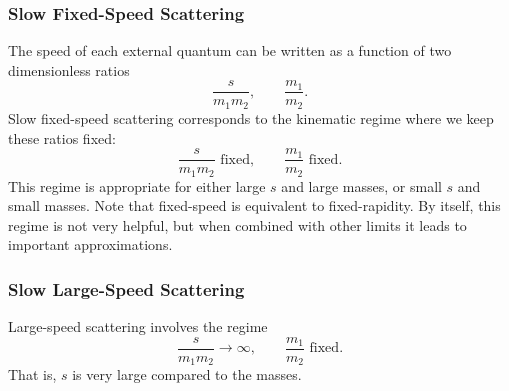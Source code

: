 \subsubsection{Slow Fixed-Speed Scattering}
The speed of each external quantum can be written as a function of two dimensionless ratios
\begin{equation}
	\frac{s}{m_{1} m_{2}}, \qquad \frac{m_{1}}{m_{2}}.
\end{equation}
Slow fixed-speed scattering corresponds to the kinematic regime where we keep these ratios fixed:
\begin{equation}
	\frac{s}{m_{1} m_{2}} \text{ fixed}, \qquad \frac{m_{1}}{m_{2}} \text{ fixed}.
\end{equation}
This regime is appropriate for either large $s$ and large masses, or small $s$ and small masses. Note that fixed-speed is equivalent to fixed-rapidity. By itself, this regime is not very helpful, but when combined with other limits it leads to important approximations.
\subsubsection{Slow Large-Speed Scattering}
Large-speed scattering involves the regime
\begin{equation}
	\frac{s}{m_{1} m_{2}} \rightarrow \infty, \qquad \frac{m_{1}}{m_{2}} \text{ fixed}.
\end{equation}
That is, $s$ is very large compared to the masses.
